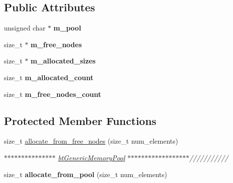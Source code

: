 \subsection*{Public Attributes}
\begin{DoxyCompactItemize}
\item 
\hypertarget{classbt_generic_memory_pool_ad9f927d2583de1ad2c731eb2a8221154}{unsigned char $\ast$ {\bfseries m\+\_\+pool}}\label{classbt_generic_memory_pool_ad9f927d2583de1ad2c731eb2a8221154}

\item 
\hypertarget{classbt_generic_memory_pool_ac215be3b5282d4567dddcfcefd797c52}{size\+\_\+t $\ast$ {\bfseries m\+\_\+free\+\_\+nodes}}\label{classbt_generic_memory_pool_ac215be3b5282d4567dddcfcefd797c52}

\item 
\hypertarget{classbt_generic_memory_pool_a96a60361b382788d4a34b7d08aaa166c}{size\+\_\+t $\ast$ {\bfseries m\+\_\+allocated\+\_\+sizes}}\label{classbt_generic_memory_pool_a96a60361b382788d4a34b7d08aaa166c}

\item 
\hypertarget{classbt_generic_memory_pool_a50e413558ea538bf216c17e54ea2109c}{size\+\_\+t {\bfseries m\+\_\+allocated\+\_\+count}}\label{classbt_generic_memory_pool_a50e413558ea538bf216c17e54ea2109c}

\item 
\hypertarget{classbt_generic_memory_pool_a08cf9f80b12fc0cda7e8ea259ad8a3dc}{size\+\_\+t {\bfseries m\+\_\+free\+\_\+nodes\+\_\+count}}\label{classbt_generic_memory_pool_a08cf9f80b12fc0cda7e8ea259ad8a3dc}

\end{DoxyCompactItemize}
\subsection*{Protected Member Functions}
\begin{DoxyCompactItemize}
\item 
\hypertarget{classbt_generic_memory_pool_ab3d627fdeb0178314779ba9b2361462a}{size\+\_\+t \hyperlink{classbt_generic_memory_pool_ab3d627fdeb0178314779ba9b2361462a}{allocate\+\_\+from\+\_\+free\+\_\+nodes} (size\+\_\+t num\+\_\+elements)}\label{classbt_generic_memory_pool_ab3d627fdeb0178314779ba9b2361462a}

\begin{DoxyCompactList}\small\item\em $\ast$$\ast$$\ast$$\ast$$\ast$$\ast$$\ast$$\ast$$\ast$$\ast$$\ast$$\ast$$\ast$$\ast$$\ast$ \hyperlink{classbt_generic_memory_pool}{bt\+Generic\+Memory\+Pool} $\ast$$\ast$$\ast$$\ast$$\ast$$\ast$$\ast$$\ast$$\ast$$\ast$$\ast$$\ast$$\ast$$\ast$$\ast$$\ast$$\ast$$\ast$/////////// \end{DoxyCompactList}\item 
\hypertarget{classbt_generic_memory_pool_a5ca2a7e3843e47c17fa6895660973762}{size\+\_\+t {\bfseries allocate\+\_\+from\+\_\+pool} (size\+\_\+t num\+\_\+elements)}\label{classbt_generic_memory_pool_a5ca2a7e3843e47c17fa6895660973762}

\end{DoxyCompactItemize}
